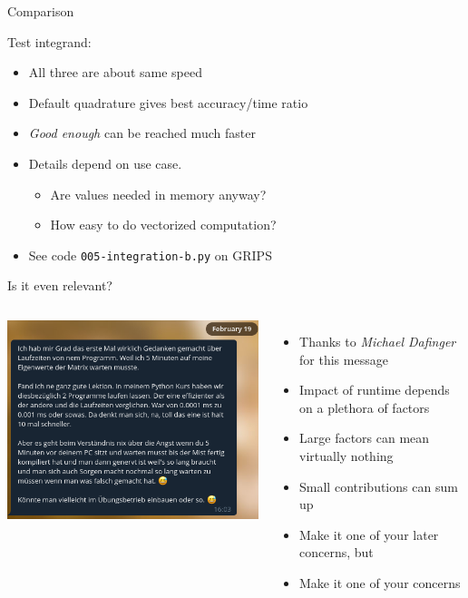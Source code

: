\begin{frame}{Comparison}
\begin{minipage}{.3\linewidth}
\end{minipage}
{\scriptsize Test integrand: }
%
\begin{itemize}
\item All three are about same speed
\item Default quadrature gives best accuracy/time ratio
\item \emph{Good enough} can be reached much faster
\item Details depend on use case. 
	\begin{itemize}
	\item Are values needed in memory anyway?
	\item How easy to do vectorized computation?
	\end{itemize}
\item See code \texttt{005-integration-b.py} on GRIPS
\end{itemize}
%
\end{frame}


\begin{frame}{Is it even relevant?}
%
\begin{columns}[T]
\begin{center}
	\includegraphics[width=\linewidth]{./gfx/Dafinger-runtime}
\end{center}
%
\begin{itemize}
\item Thanks to \emph{Michael Dafinger} for this message
\item Impact of runtime depends on a plethora of factors
\item Large factors can mean virtually nothing
\item Small contributions can sum up
\item[\Thus] Make it one of your later concerns, but
\item[\Thus] Make it one of your concerns
\end{itemize}
\end{columns}
%
\end{frame}

